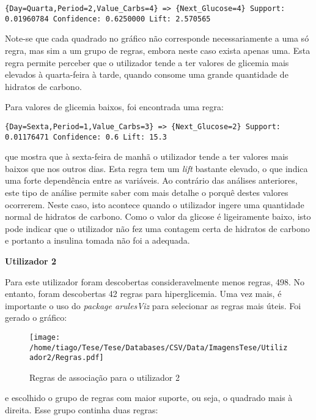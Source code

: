 \begin{lstlisting}
{Day=Quarta,Period=2,Value_Carbs=4} => {Next_Glucose=4} Support: 0.01960784 Confidence: 0.6250000 Lift: 2.570565

\end{lstlisting}   
Note-se que cada quadrado no gráfico não corresponde necessariamente a uma só regra, mas sim a um grupo de regras, embora neste caso exista apenas uma. Esta regra permite perceber que o utilizador tende a ter valores de glicemia mais elevados à quarta-feira à tarde, quando consome uma grande quantidade de hidratos de carbono.

Para valores de glicemia baixos, foi encontrada uma regra:

\begin{lstlisting}
{Day=Sexta,Period=1,Value_Carbs=3} => {Next_Glucose=2} Support:  0.01176471 Confidence: 0.6 Lift: 15.3
\end{lstlisting}
que mostra que à sexta-feira de manhã o utilizador tende a ter valores mais baixos que nos outros dias. Esta regra tem um \textit{lift} bastante elevado, o que indica uma forte dependência entre as variáveis. Ao contrário das análises anteriores, este tipo de análise permite saber com mais detalhe o porquê destes valores ocorrerem. Neste caso, isto acontece quando o utilizador ingere uma quantidade normal de hidratos de carbono. Como o valor da glicose é ligeiramente baixo, isto pode indicar que o utilizador não fez uma contagem certa de hidratos de carbono e portanto a insulina tomada não foi a adequada.


\textbf{Utilizador 2}

Para este utilizador foram descobertas consideravelmente menos regras, 498. No entanto, foram descobertas 42 regras para hiperglicemia. Uma vez mais, é importante o uso do \textit{package arulesViz} para selecionar as regras mais úteis. Foi gerado o gráfico:


\begin{figure}[H]
\centering
\texttt{[image: /home/tiago/Tese/Tese/Databases/CSV/Data/ImagensTese/Utilizador2/Regras.pdf]}
\caption{Regras de associação para o utilizador 2}
\end{figure}
e escolhido o grupo de regras com maior suporte, ou seja, o quadrado mais à direita. Esse grupo continha duas regras:

